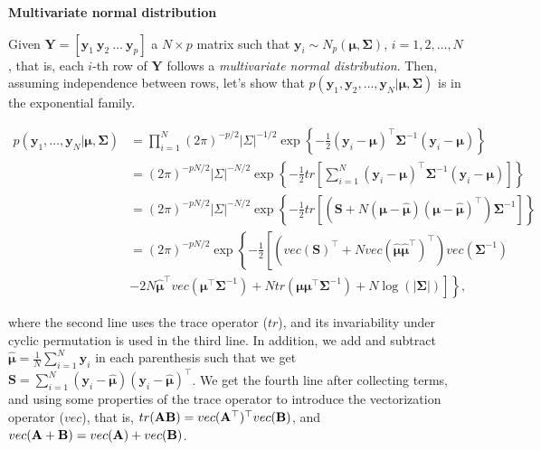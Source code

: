 \begin{enumerate}
\textbf{Multivariate normal distribution}

Given $\mathbf{Y}=[\mathbf{y}_1 \ \mathbf{y}_2 \ \dots \ \mathbf{y}_p]$ a $N\times p$ matrix such that $\mathbf{y}_i\sim N_p(\mathbf{\mu},\mathbf{\Sigma})$, $i=1,2,\dots,N$, that is, each $i$-th row of $\mathbf{Y}$ follows a \textit{multivariate normal distribution}. Then, assuming independence between rows, let's show that $p(\mathbf{y}_1,\mathbf{y}_2,\dots,\mathbf{y}_N|\mathbf{\mu},\mathbf{\Sigma})$ is in the exponential family.

{\footnotesize{
\begin{align}
	p(\mathbf{y}_1,\dots,\mathbf{y}_N|\mathbf{\mu},\mathbf{\Sigma})&=\prod_{i=1}^N (2\pi)^{-p/2}|\Sigma|^{-1/2}\exp\left\{-\frac{1}{2}\left(\mathbf{y}_i-\mathbf{\mu}\right)^{\top}\mathbf{\Sigma}^{-1}\left(\mathbf{y}_i-\mathbf{\mu}\right)\right\}\nonumber\\
	&= (2\pi)^{-pN/2}|\Sigma|^{-N/2}\exp\left\{-\frac{1}{2}tr\left[\sum_{i=1}^N\left(\mathbf{y}_i-\mathbf{\mu}\right)^{\top}\mathbf{\Sigma}^{-1}\left(\mathbf{y}_i-\mathbf{\mu}\right)\right]\right\}\nonumber\\
	&= (2\pi)^{-p N/2}|\Sigma|^{-N/2}\exp\left\{-\frac{1}{2}tr\left[\left(\mathbf{S}+N\left(\mathbf{\mu}-\hat{\mathbf{\mu}}\right)\left(\mathbf{\mu}-\hat{\mathbf{\mu}}\right)^{\top}\right)\mathbf{\Sigma}^{-1}\right]\right\}\nonumber\\
	&= (2\pi)^{-p N/2}\exp\left\{-\frac{1}{2}\left[\left(vec\left(\mathbf{S}\right)^{\top}+N vec\left(\hat{\mathbf{\mu}}\hat{\mathbf{\mu}}^{\top}\right)^{\top}\right)vec \left(\mathbf{\Sigma}^{-1}\right)\right.\right.\nonumber\\
	&\left.\left.-2N\hat{\mathbf{\mu}}^{\top}vec\left(\mathbf{\mu}^{\top}\mathbf{\Sigma}^{-1}\right)+N tr\left(\mathbf{\mu}\mathbf{\mu}^{\top}\mathbf{\Sigma}^{-1}\right)+N\log (|\mathbf{\Sigma}|)\right]\right\}\nonumber,
\end{align}
}}

where the second line uses the trace operator ($tr$), and its invariability under cyclic permutation is used in the third line. In addition, we add and subtract $\hat{\mathbf{\mu}}=\frac{1}{N}\sum_{i=1}^N\mathbf{y}_i$ in each parenthesis such that we get $\mathbf{S}=\sum_{i=1}^N\left(\mathbf{y}_i-\hat{\mathbf{\mu}}\right)\left(\mathbf{y}_i-\hat{\mathbf{\mu}}\right)^{\top}$. We get the fourth line after collecting terms, and using some properties of the trace operator to introduce the vectorization operator ($vec$), that is, $tr({\bf{AB}})=vec({\bf{A}}^{\top})^{\top}vec({\bf{B}})$, and $vec({\bf{A}}+{\bf{B}})=vec({\bf{A}})+vec({\bf{B}})$.


\end{enumerate}
